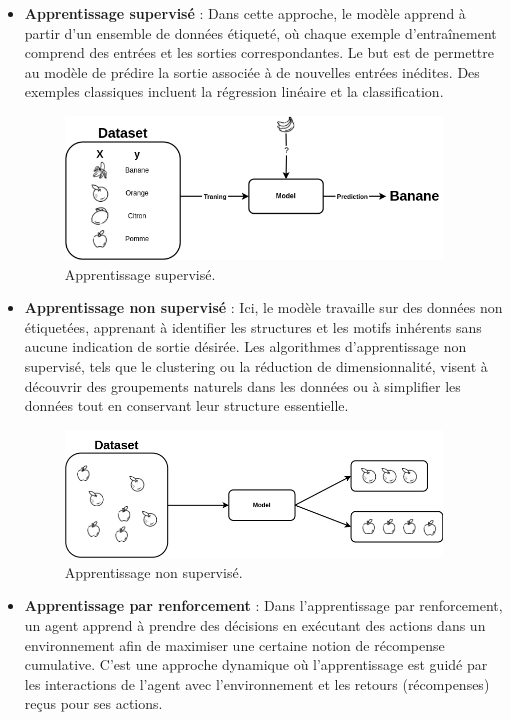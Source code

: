 \begin{itemize}
    \item \textbf{Apprentissage supervisé} : Dans cette approche, le modèle apprend à partir d'un ensemble de données étiqueté, où chaque exemple d'entraînement comprend des entrées et les sorties correspondantes. Le but est de permettre au modèle de prédire la sortie associée à de nouvelles entrées inédites. Des exemples classiques incluent la régression linéaire et la classification.

    \begin{figure}[H]
        \centering
        \includegraphics[width=10cm]{gfx/fig-supervised-learning.png}
        \caption{Apprentissage supervisé.}
        \label{fig:supervised-learning}
    \end{figure}

    \item \textbf{Apprentissage non supervisé} : Ici, le modèle travaille sur des données non étiquetées, apprenant à identifier les structures et les motifs inhérents sans aucune indication de sortie désirée. Les algorithmes d'apprentissage non supervisé, tels que le clustering ou la réduction de dimensionnalité, visent à découvrir des groupements naturels dans les données ou à simplifier les données tout en conservant leur structure essentielle.

    \begin{figure}[H]
        \centering
        \includegraphics[width=10cm]{gfx/fig-unsupervised-learning.png}
        \caption{Apprentissage non supervisé.}
        \label{fig:unsupervised-learning}
    \end{figure}

    \item \textbf{Apprentissage par renforcement} : Dans l'apprentissage par renforcement, un agent apprend à prendre des décisions en exécutant des actions dans un environnement afin de maximiser une certaine notion de récompense cumulative. C'est une approche dynamique où l'apprentissage est guidé par les interactions de l'agent avec l'environnement et les retours (récompenses) reçus pour ses actions.


\end{itemize}
